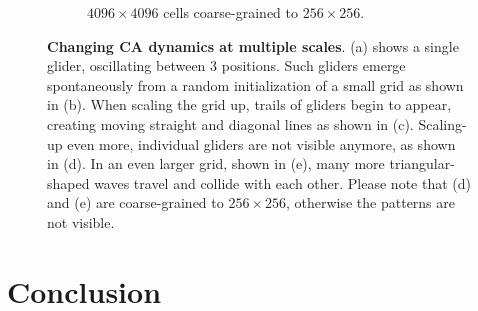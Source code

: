 \begin{figure}[ht]
\begin{subfigure}{.48\linewidth}
    \caption{\label{subfig:waves_c} $4096 \times 4096$ cells coarse-grained to $256 \times 256$.}
  \end{subfigure}
  \caption{\label{fig:dynamics_levels} \textbf{Changing CA dynamics at multiple
      scales}. (a) shows a single glider, oscillating between 3 positions. Such
    gliders emerge spontaneously from a random initialization of a small grid as
    shown in (b). When scaling the grid up, trails of gliders begin to appear,
    creating moving straight and diagonal lines as shown in (c). Scaling-up even
    more, individual gliders are not visible anymore, as shown in (d). In an
    even larger grid, shown in (e), many more triangular-shaped waves travel and
    collide with each other. Please note that (d) and (e) are coarse-grained to
    $256 \times 256$, otherwise the patterns are not visible.}
\end{figure}




\section{Conclusion\label{sec:conclusion-vc}}

